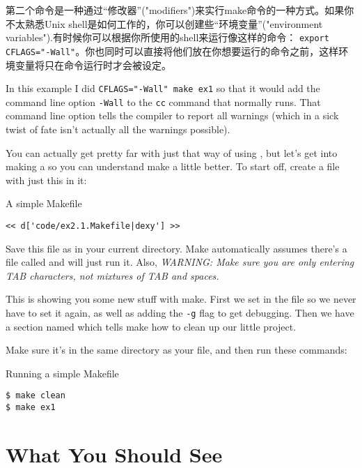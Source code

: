第二个命令是一种通过“修改器”("modifiers")来实行make命令的一种方式。如果你不太熟悉Unix shell是如何工作的，你可以创建些“环境变量”("environment variables").有时候你可以根据你所使用的shell来运行像这样的命令： \verb|export CFLAGS="-Wall"|。你也同时可以直接将他们放在你想要运行的命令之前，这样环境变量将只在命令运行时才会被设定。

In this example I did \verb|CFLAGS="-Wall" make ex1| so that it would
add the command line option \verb|-Wall| to the \verb|cc| command that
 normally runs.  That command line option tells the compiler
 to report all warnings (which in a sick twist of fate isn't
actually all the warnings possible).

You can actually get pretty far with just that way of using ,
but let's get into making a  so you can understand
make a little better.  To start off, create a file with just this
in it:

\begin{code}{A simple Makefile}
\begin{lstlisting}
<< d['code/ex2.1.Makefile|dexy'] >>
\end{lstlisting}
\end{code}

Save this file as  in your current directory.  Make
automatically assumes there's a file called  and will
just run it.  Also, \emph{WARNING: Make sure you are only entering TAB
characters, not mixtures of TAB and spaces.}

This  is showing you some new stuff with make.  First we set
 in the file so we never have to set it again, as well
as adding the \verb|-g| flag to get debugging.  Then we have a 
section named  which tells make how to clean up our
little project.

Make sure it's in the same directory as your  file, and then
run these commands:

\begin{Terminal}{Running a simple Makefile}
\begin{lstlisting}
$ make clean
$ make ex1
\end{lstlisting}
\end{Terminal}

\section{What You Should See}

